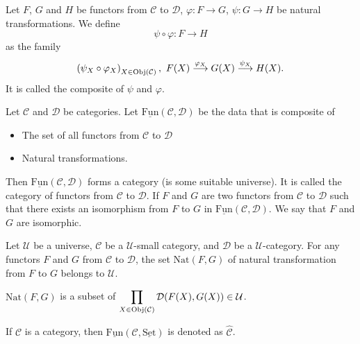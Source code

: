 \begin{exampleenv}
    Let $F$, $G$ and $H$ be functors from $\mathcal{C}$ to $\mathcal{D}$, $\varphi: F\rightarrow G$, $\psi:G\rightarrow H$ be natural transformations. We define
    $$\psi\circ \varphi: F\rightarrow H$$
    as the family 
    $$ \left(\psi_X\circ\varphi_X\right)_{X\in \Obj(\mathcal{C})},\ F(X)\overset{\varphi_X}{\longrightarrow}G(X)\overset{\psi_X}{\longrightarrow}H(X).$$
    It is called the composite of $\psi$ and $\varphi$.
\end{exampleenv}
\begin{remark}
    Let $\mathcal{C}$ and $\mathcal{D}$ be categories. Let $\underline{\mathrm{Fun}}(\mathcal{C},\mathcal{D})$ be the data that is composite of
    \begin{itemize}
        \item The set of all functors from $\mathcal{C}$ to $\mathcal{D}$
        \item Natural transformations.
    \end{itemize}
    Then $\underline{\mathrm{Fun}}(\mathcal{C},\mathcal{D})$ forms a category (is some suitable universe). It is called the category of functors from $\mathcal{C}$ to $\mathcal{D}$. If $F$ and $G$ are two functors from $\mathcal{C}$ to $\mathcal{D}$ such that there exists an isomorphism from $F$ to $G$ in $\underline{\mathrm{Fun}}(\mathcal{C},\mathcal{D})$. We say that $F$ and $G$ are isomorphic.
\end{remark}
\begin{propositionenv}
    Let $\mathcal{U}$ be a universe, $\mathcal{C}$ be a $\mathcal{U}$-small category, and $\mathcal{D}$ be a $\mathcal{U}$-category. For any functors $F$ and $G$ from $\mathcal{C}$ to $\mathcal{D}$, the set $\mathrm{Nat}(F,G)$ of natural transformation from $F$ to $G$ belongs to $\mathcal{U}$.
\end{propositionenv}
\begin{proofenv}
    $\mathrm{Nat}(F,G)$ is a subset of $\displaystyle \prod_{X\in \operatorname{\mathrm{Obj}}(\mathcal{C})}\mathcal{D}(F(X),G(X))\in \mathcal{U}$.
\end{proofenv}
\begin{notationenv}
    If $\mathcal{C}$ is a category, then $\underline{\mathrm{Fun}}(\mathcal{C},\underline{\mathrm{Set}})$ is denoted as $\hat{\mathcal{C}}$.
\end{notationenv}
\newpage
